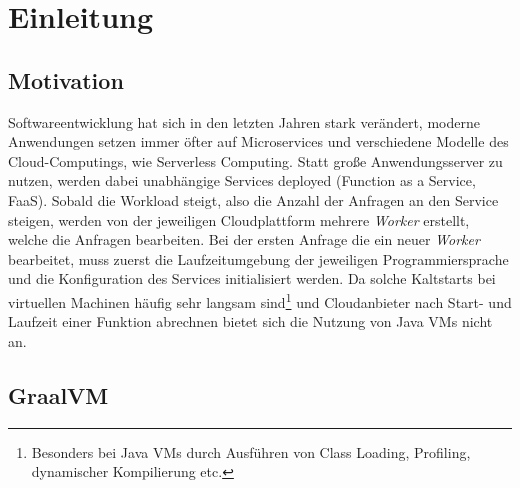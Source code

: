 \section{Einleitung}
\label{sec:einleitung}

\subsection{Motivation}
\label{subsec:motivation}
Softwareentwicklung hat sich in den letzten Jahren stark verändert, moderne Anwendungen setzen immer öfter auf Microservices und verschiedene Modelle des Cloud-Computings, wie
Serverless Computing. Statt große Anwendungsserver zu nutzen, werden dabei unabhängige Services deployed (Function as a Service, FaaS). Sobald die Workload steigt, also die Anzahl der Anfragen an den Service steigen,
werden von der jeweiligen Cloudplattform mehrere \textit{Worker} erstellt, welche die Anfragen bearbeiten. Bei der ersten Anfrage die ein neuer \textit{Worker} bearbeitet, muss zuerst die Laufzeitumgebung 
der jeweiligen Programmiersprache und die Konfiguration des Services initialisiert werden. Da solche Kaltstarts bei virtuellen Machinen häufig sehr langsam sind\footnote{Besonders bei Java VMs
 durch Ausführen von Class Loading, Profiling, dynamischer Kompilierung etc.} und Cloudanbieter nach Start- und Laufzeit einer Funktion abrechnen bietet sich die Nutzung von Java VMs nicht an.

\subsection{GraalVM}
\label{subsec:graalvm}

